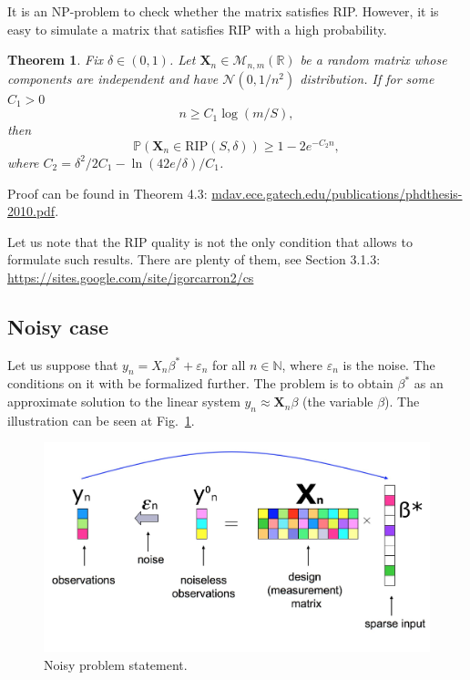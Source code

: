 \documentclass[11pt]{article}
\numberwithin{equation}{section}
\newtheorem{theorem}{Theorem}[section]
\theoremstyle{definition}
\begin{document}
It is an NP-problem to check whether the matrix satisfies RIP.
However, it is easy to simulate a matrix that satisfies RIP with a high probability.

\begin{theorem}
    Fix $\delta \in (0, 1)$.
    Let $\mathbf X_n \in \mathcal M_{n, m} (\mathbb R)$ be a random matrix whose components are independent and have $\mathcal N(0, 1/n^2)$ distribution.
    If for some $C_1 > 0$
    $$ n \geqslant C_1 \log(m / S), $$
    then 
    $$ \mathbb P(\mathbf X_n \in \textrm{RIP}(S, \delta)) \geq 1 - 2 e^{-C_2 n}, $$
    where $C_2 = \delta^2/2C_1 - \ln (42 e / \delta) / C_1$.
\end{theorem}
Proof can be found in Theorem 4.3: \url{mdav.ece.gatech.edu/publications/phdthesis-2010.pdf}.

Let us note that the RIP quality is not the only condition that allows to formulate such results.
There are plenty of them, see Section 3.1.3: \url{https://sites.google.com/site/igorcarron2/cs}

\subsection{Noisy case}
Let us suppose that $y_n = X_n \beta^* + \varepsilon_n$ for all $n \in \mathbb N$, where $\varepsilon_n$ is the noise.
The conditions on it with be formalized further.
The problem is to obtain $\beta^*$ as an approximate solution to the linear system $y_n \approx \mathbf X_n \beta$ (the variable $\beta$).
The illustration can be seen at Fig.~\ref{fig:NoisyProblemStatement}.
\begin{figure}[H]
    \begin{center}
        \includegraphics[width=.75\textwidth]{figures/problem_statement_3_noisy.pdf}
    \end{center}
    \caption{
        \label{fig:NoisyProblemStatement}
        Noisy problem statement.
    }
\end{figure}
\end{document}
